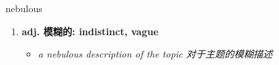 
\begin{frame}
{\huge nebulous}
\begin{center}
\begin{enumerate}\Large
  \item \textbf{adj. 模糊的: indistinct, vague}
  \begin{itemize}
    \item \em{\Large{a nebulous description of the topic 对于主题的模糊描述}}
  \end{itemize}
\end{enumerate}
\end{center}
\end{frame}

